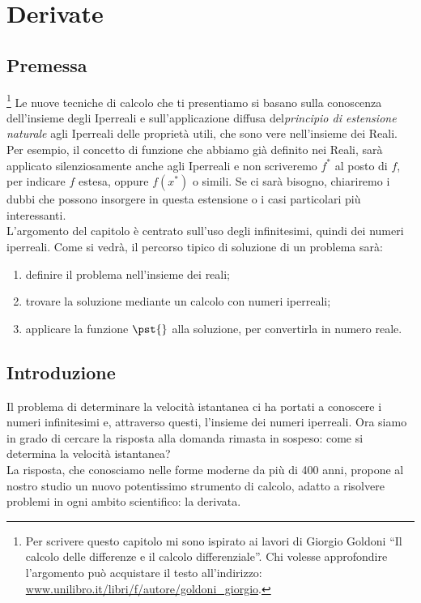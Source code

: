 ﻿%



\chapter{Derivate}

\section{Premessa}
\footnote{Per scrivere questo capitolo mi sono ispirato 
ai lavori di Giorgio Goldoni ``Il calcolo delle differenze e il calcolo 
differenziale''. 
Chi volesse approfondire l'argomento può acquistare il testo 
all'indirizzo: 
\href{https://www.unilibro.it/libri/f/autore/goldoni\_giorgio}
     {www.unilibro.it/libri/f/autore/goldoni\_giorgio}.}
Le nuove tecniche di calcolo che ti presentiamo si basano sulla conoscenza 
dell'insieme degli Iperreali e sull'applicazione diffusa del\emph{principio di estensione naturale} agli Iperreali delle proprietà utili, che sono vere nell'insieme dei Reali.\\
Per esempio, il concetto di funzione che abbiamo già definito nei Reali, sarà 
applicato silenziosamente anche agli Iperreali e non scriveremo $f^*$ al posto 
di $f$, per indicare $f$ estesa, oppure $f(x^*)$ o simili. 
Se ci sarà bisogno, chiariremo i dubbi che possono insorgere in questa 
estensione o i casi particolari più interessanti.\\
L'argomento del capitolo è centrato sull'uso degli infinitesimi, quindi dei 
numeri iperreali. Come si vedrà, il percorso tipico di soluzione di un problema 
sarà: 
\begin{enumerate}
\item definire il problema nell'insieme dei reali;
\item trovare la soluzione mediante un calcolo con numeri iperreali;
\item applicare la funzione $\pst{}$ alla soluzione, per convertirla in numero 
reale.
\end{enumerate}

\section{Introduzione}
\label{}
Il problema di determinare la velocità istantanea ci ha portati a conoscere 
i numeri infinitesimi e, attraverso questi, l'insieme dei numeri iperreali.
Ora siamo in grado di cercare la risposta alla domanda rimasta in sospeso: 
come si determina la velocità istantanea?\\
La risposta, che conosciamo nelle forme moderne da più di 400 anni,
propone al nostro studio un nuovo potentissimo strumento di calcolo, 
adatto a risolvere problemi in ogni ambito scientifico: la derivata.

